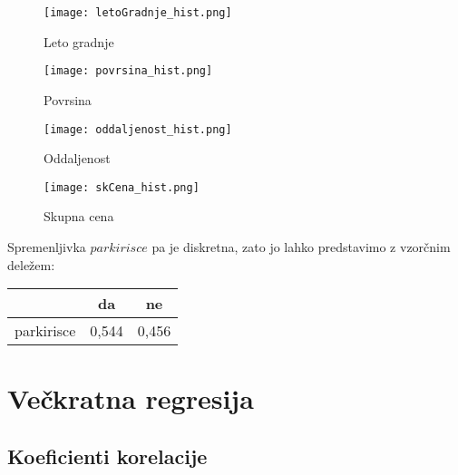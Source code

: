 \documentclass[a4paper, 12pt]{article}
\begin{document}
\begin{figure}[H]
	\centering
	\texttt{[image: letoGradnje\_hist.png]}
	\caption{Leto gradnje}
\end{figure}

\begin{figure}[H]
	\centering
	\texttt{[image: povrsina\_hist.png]}
	\caption{Povrsina}
\end{figure}

\begin{figure}[H]
	\centering
	\texttt{[image: oddaljenost\_hist.png]}
	\caption{Oddaljenost}
\end{figure}

\begin{figure}[H]
	\centering
	\texttt{[image: skCena\_hist.png]}
	\caption{Skupna cena}
\end{figure}

Spremenljivka $ parkirisce $ pa je diskretna, zato jo lahko predstavimo z
vzorčnim deležem:

\begin{center}
\begin{tabular}{ c|cc }
	& da & ne \\
	\hline
	parkirisce & 0,544 & 0,456 \\
\end{tabular}
\end{center}


\section{Večkratna regresija}

\subsection{Koeficienti korelacije}
\end{document}
